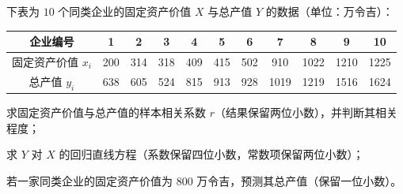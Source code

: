\documentclass[12pt,a4paper]{exam-zh}
\begin{document}
\begin{question}
    下表为 $10$ 个同类企业的固定资产价值 $X$ 与总产值 $Y$ 的数据（单位：万令吉）：
    \begin{center}
        \small
        \begin{tabular}{c|*{10}{c}}
            \hline
            企业编号 & 1 & 2 & 3 & 4 & 5 & 6 & 7 & 8 & 9 & 10 \\
            \hline
            固定资产价值 $x_i$ & 200 & 314 & 318 & 409 & 415 & 502 & 910 & 1022 & 1210 & 1225 \\
            \hline
            总产值 $y_i$ & 638 & 605 & 524 & 815 & 913 & 928 & 1019 & 1219 & 1516 & 1624 \\
            \hline
        \end{tabular}
    \end{center}

    \begin{questionparts}
        \item 求固定资产价值与总产值的样本相关系数 $r$（结果保留两位小数），并判断其相关程度；

        \item 求 $Y$ 对 $X$ 的回归直线方程（系数保留四位小数，常数项保留两位小数）；

        \item 若一家同类企业的固定资产价值为 $800$ 万令吉，预测其总产值（保留一位小数）。
    \end{questionparts}
\end{question}
\end{document}
